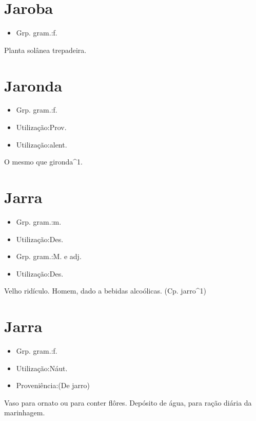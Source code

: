 \documentclass{article}
\begin{document}
\section{Jaroba}
\begin{itemize}
\item {Grp. gram.:f.}
\end{itemize}
Planta solânea trepadeira.
\section{Jaronda}
\begin{itemize}
\item {Grp. gram.:f.}
\end{itemize}
\begin{itemize}
\item {Utilização:Prov.}
\end{itemize}
\begin{itemize}
\item {Utilização:alent.}
\end{itemize}
O mesmo que \textunderscore gironda\textunderscore ^1.
\section{Jarra}
\begin{itemize}
\item {Grp. gram.:m.}
\end{itemize}
\begin{itemize}
\item {Utilização:Des.}
\end{itemize}
\begin{itemize}
\item {Grp. gram.:M.  e  adj.}
\end{itemize}
\begin{itemize}
\item {Utilização:Des.}
\end{itemize}
Velho ridículo.
Homem, dado a bebidas alcoólicas.
(Cp. \textunderscore jarro\textunderscore ^1)
\section{Jarra}
\begin{itemize}
\item {Grp. gram.:f.}
\end{itemize}
\begin{itemize}
\item {Utilização:Náut.}
\end{itemize}
\begin{itemize}
\item {Proveniência:(De \textunderscore jarro\textunderscore )}
\end{itemize}
Vaso para ornato ou para conter flôres.
Depósito de água, para ração diária da marinhagem.
\end{document}
